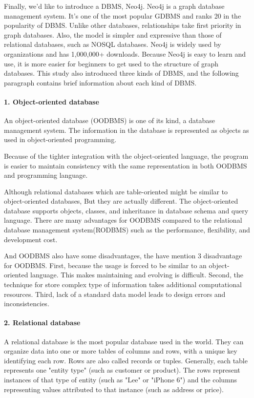 Finally, we'd like to introduce a DBMS, Neo4j. Neo4j is a graph database management system. It's one of the most popular GDBMS and ranks 20 in the popularity of DBMS. Unlike other databases, relationships take first priority in graph databases. Also, the model is simpler and expressive than those of relational databases, such as NOSQL databases. Neo4j is widely used by organizations and has 1,000,000+ downloads. Because Neo4j is easy to learn and use, it is more easier for beginners to get used to the structure of graph databases. This study also introduced three kinds of DBMS, and the following paragraph contains brief information about each kind of DBMS.

\paragraph{1. Object-oriented database}
An object-oriented database (OODBMS) is one of its kind, a database management system.\cite{WiKiauthor2013} The information in the database is represented as objects as used in object-oriented programming.

Because of the tighter integration with the object-oriented language, the program is easier to maintain consistency with the same representation in both OODBMS and programming language.

Although relational databases which are table-oriented might be similar to object-oriented databases, But they are actually different. The object-oriented database supports objects, classes, and inheritance in database schema and query language.
There are many advantages for OODBMS compared to the relational database management system(RODBMS) such as the performance, flexibility, and development cost.

And OODBMS also have some disadvantages, the \cite{Systems2010} have mention 3 disadvantage for OODBMS. First, because the usage is forced to be similar to an object-oriented language. This makes maintaining and evolving is difficult. Second, the technique for store complex type of information takes additional computational resources. Third, lack of a standard data model leads to design errors and inconsistencies.


\paragraph{2. Relational database}
A relational database is the most popular database used in the world. They can organize data into one or more tables of columns and rows, with a unique key identifying each row. Rows are also called records or tuples. Generally, each table represents one "entity type" (such as customer or product). The rows represent instances of that type of entity (such as "Lee" or "iPhone 6") and the columns representing values attributed to that instance (such as address or price).


